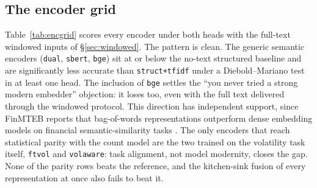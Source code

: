 \documentclass[logo,msc,ai]{infthesis}        %
\begin{document}
\subsection{The encoder grid}
Table~\ref{tab:encgrid} scores every encoder under both heads with the full-text windowed inputs of \S\ref{sec:windowed}. The pattern is clean. The generic semantic encoders (\texttt{dual}, \texttt{sbert}, \texttt{bge}) sit at or below the no-text structured baseline and are significantly less accurate than \texttt{struct+tfidf} under a Diebold--Mariano test in at least one head. The inclusion of \texttt{bge} settles the ``you never tried a strong modern embedder'' objection: it loses too, even with the full text delivered through the windowed protocol. This direction has independent support, since FinMTEB reports that bag-of-words representations outperform dense embedding models on financial semantic-similarity tasks \cite{tang-yang-2025-finmteb}. The only encoders that reach statistical parity with the count model are the two trained on the volatility task itself, \texttt{ftvol} and \texttt{volaware}: task alignment, not model modernity, closes the gap. None of the parity rows beats the reference, and the kitchen-sink fusion of every representation at once also fails to beat it.
\end{document}
